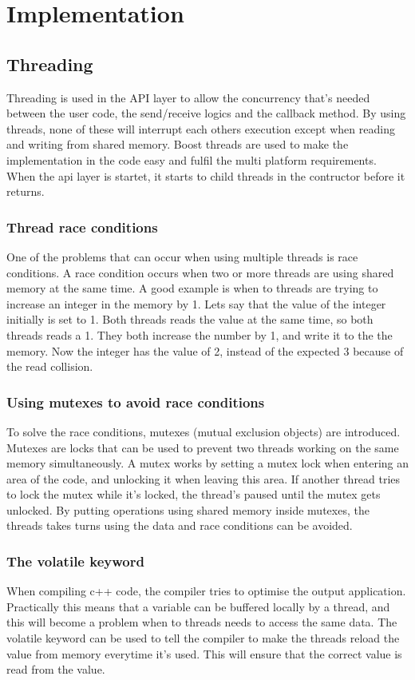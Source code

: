 \section{Implementation}
\subsection{Threading}
\label{threading}
Threading is used in the API layer to allow the concurrency that's needed between the user code, the send/receive logics and the callback method. By using threads, none of these will interrupt each others execution except when reading and writing from shared memory. Boost threads are used to make the implementation in the code easy and fulfil the multi platform requirements. When the api layer is startet, it starts to child threads in the contructor before it returns.

\subsubsection{Thread race conditions}
\label{thread_race_conditions}
One of the problems that can occur when using multiple threads is race conditions. A race condition occurs when two or more threads are using shared memory at the same time. A good example is when to threads are trying to increase an integer in the memory by 1. Lets say that the value of the integer initially is set to 1. Both threads reads the value at the same time, so both threads reads a 1. They both increase the number by 1, and write it to the the memory. Now the integer has the value of 2, instead of the expected 3 because of the read collision.

\subsubsection{Using mutexes to avoid race conditions}
To solve the race conditions, mutexes (mutual exclusion objects) are introduced. Mutexes are locks that can be used to prevent two threads working on the same memory simultaneously. A mutex works by setting a mutex lock when entering an area of the code, and unlocking it when leaving this area. If another thread tries to lock the mutex while it's locked, the thread's paused until the mutex gets unlocked. By putting operations using shared memory inside mutexes, the threads takes turns using the data and race conditions can be avoided.

\subsubsection{The volatile keyword}
When compiling c++ code, the compiler tries to optimise the output application. Practically this means that a variable can be buffered locally by a thread, and this will become a problem when to threads needs to access the same data. The volatile keyword can be used to tell the compiler to make the threads reload the value from memory everytime it's used. This will ensure that the correct value is read from the value.

